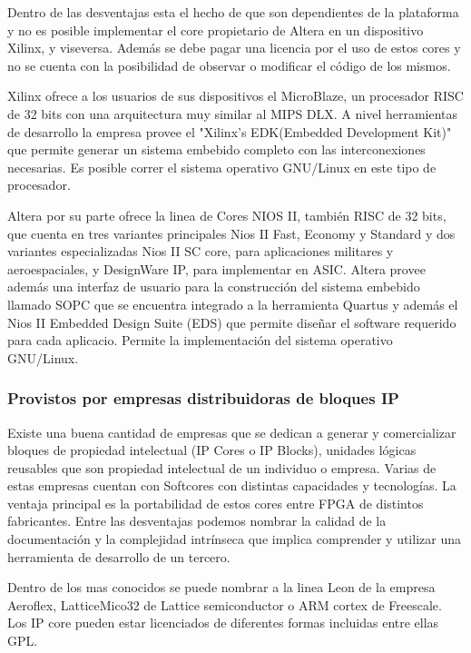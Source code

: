 Dentro de las desventajas esta el hecho de que son dependientes de la plataforma y no es posible implementar el core propietario de Altera en un dispositivo Xilinx, y viseversa. Además se debe pagar una licencia por el uso de estos cores y no se cuenta con la posibilidad de observar o modificar el código de los mismos. 

Xilinx ofrece a los usuarios de sus dispositivos el MicroBlaze, un procesador RISC de 32 bits con una arquitectura muy similar al MIPS DLX. A nivel herramientas de desarrollo la empresa provee el "Xilinx's EDK(Embedded Development Kit)" que permite generar un sistema embebido completo con las interconexiones necesarias. Es posible correr el sistema operativo GNU/Linux en este tipo de procesador.

Altera por su parte ofrece la linea de Cores NIOS II, también RISC de 32 bits, que cuenta en tres variantes principales Nios II Fast, Economy y Standard y dos variantes especializadas Nios II SC core, para aplicaciones militares y aeroespaciales, y DesignWare IP, para implementar en ASIC. Altera provee además una interfaz de usuario para la construcción del sistema embebido llamado SOPC que se encuentra integrado a la herramienta Quartus y además el Nios II Embedded Design Suite (EDS) que permite diseñar el software requerido para cada aplicacio. Permite la implementación del sistema operativo GNU/Linux.

\subsubsection{Provistos por empresas distribuidoras de bloques IP}
Existe una buena cantidad de empresas que se dedican a generar y comercializar bloques de propiedad intelectual (IP Cores o IP Blocks), unidades lógicas reusables que son propiedad intelectual de un individuo o empresa.
Varias de estas empresas cuentan con Softcores con distintas capacidades y tecnologías. La ventaja principal es la portabilidad de estos cores entre FPGA de distintos fabricantes. Entre las desventajas podemos nombrar la calidad de la documentación y la complejidad intrínseca que implica comprender y utilizar una herramienta de desarrollo de un tercero. 

Dentro de los mas conocidos se puede nombrar a la linea Leon de la empresa Aeroflex, LatticeMico32 de Lattice semiconductor o ARM cortex de Freescale. Los IP core pueden estar licenciados de diferentes formas incluidas entre ellas GPL.
 
